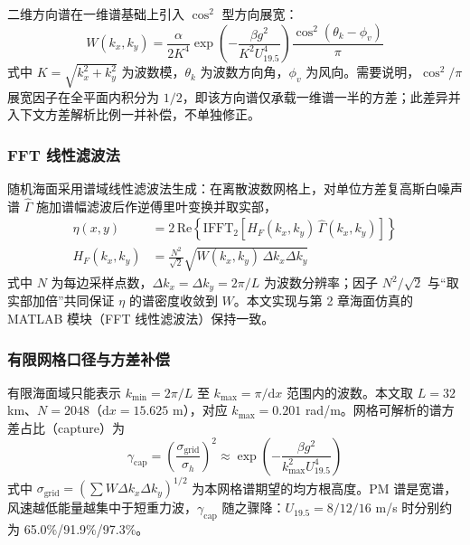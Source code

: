 \documentclass[a4paper]{article}
\begin{document}
二维方向谱在一维谱基础上引入 $\cos^{2}$ 型方向展宽：
\begin{equation}
	W(k_x, k_y) = \frac{\alpha}{2 K^{4}} \exp\!\left( -\frac{\beta g^{2}}{K^{2} U_{19.5}^{4}} \right) \frac{\cos^{2}(\theta_k - \phi_v)}{\pi}
	\label{eq:pm2d}
\end{equation}
式中 $K = \sqrt{k_x^{2} + k_y^{2}}$ 为波数模，$\theta_k$ 为波数方向角，$\phi_v$ 为风向。需要说明，$\cos^{2}/\pi$ 展宽因子在全平面内积分为 $1/2$，即该方向谱仅承载一维谱一半的方差；此差异并入下文方差解析比例一并补偿，不单独修正。

\subsubsection{FFT 线性滤波法}

随机海面采用谱域线性滤波法\cite{thorsos1990}生成：在离散波数网格上，对单位方差复高斯白噪声谱 $\hat\Gamma$ 施加谱幅滤波后作逆傅里叶变换并取实部，
\begin{equation}
\begin{aligned}
	\eta(x, y) &= 2\, \mathrm{Re} \left\{ \mathrm{IFFT}_2 \left[ H_F(k_x, k_y)\, \hat\Gamma(k_x, k_y) \right] \right\} \\
	H_F(k_x, k_y) &= \frac{N^{2}}{\sqrt{2}} \sqrt{W(k_x, k_y)\, \Delta k_x \Delta k_y}
\end{aligned}
\label{eq:fft}
\end{equation}
式中 $N$ 为每边采样点数，$\Delta k_x = \Delta k_y = 2\pi/L$ 为波数分辨率；因子 $N^{2}/\sqrt{2}$ 与“取实部加倍”共同保证 $\eta$ 的谱密度收敛到 $W$。本文实现与第 2 章海面仿真的 MATLAB 模块（FFT 线性滤波法）保持一致。

\subsubsection{有限网格口径与方差补偿}

有限海面域只能表示 $k_{\min} = 2\pi/L$ 至 $k_{\max} = \pi/\mathrm{d}x$ 范围内的波数。本文取 $L = 32$ km、$N = 2048$（$\mathrm{d}x = 15.625$ m），对应 $k_{\max} = 0.201$ rad/m。网格可解析的谱方差占比（capture）为
\begin{equation}
	\gamma_{\mathrm{cap}} = \left( \frac{\sigma_{\mathrm{grid}}}{\sigma_h} \right)^{2} \approx \exp\!\left( -\frac{\beta g^{2}}{k_{\max}^{2} U_{19.5}^{4}} \right)
	\label{eq:capture}
\end{equation}
式中 $\sigma_{\mathrm{grid}} = \left( \sum W \Delta k_x \Delta k_y \right)^{1/2}$ 为本网格谱期望的均方根高度。PM 谱是宽谱，风速越低能量越集中于短重力波，$\gamma_{\mathrm{cap}}$ 随之骤降：$U_{19.5} = 8/12/16$ m/s 时分别约为 65.0\%/91.9\%/97.3\%。
\end{document}
